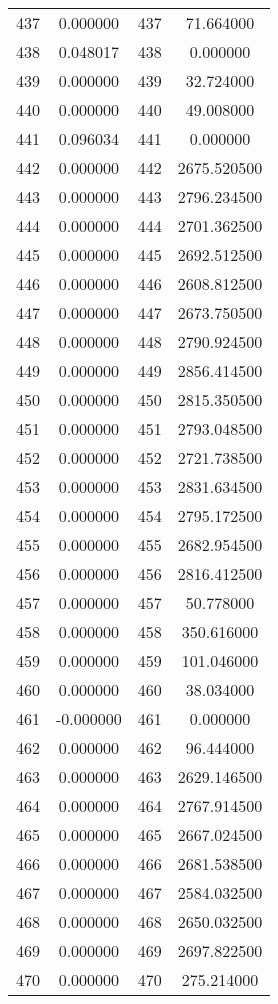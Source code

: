 \documentclass[12pt]{article}
\begin{document}
\begin{longtable}{@{}cccc@{}}
437 & 0.000000 & 437 & 71.664000 \\
438 & 0.048017 & 438 & 0.000000 \\
439 & 0.000000 & 439 & 32.724000 \\
440 & 0.000000 & 440 & 49.008000 \\
441 & 0.096034 & 441 & 0.000000 \\
442 & 0.000000 & 442 & 2675.520500 \\
443 & 0.000000 & 443 & 2796.234500 \\
444 & 0.000000 & 444 & 2701.362500 \\
445 & 0.000000 & 445 & 2692.512500 \\
446 & 0.000000 & 446 & 2608.812500 \\
447 & 0.000000 & 447 & 2673.750500 \\
448 & 0.000000 & 448 & 2790.924500 \\
449 & 0.000000 & 449 & 2856.414500 \\
450 & 0.000000 & 450 & 2815.350500 \\
451 & 0.000000 & 451 & 2793.048500 \\
452 & 0.000000 & 452 & 2721.738500 \\
453 & 0.000000 & 453 & 2831.634500 \\
454 & 0.000000 & 454 & 2795.172500 \\
455 & 0.000000 & 455 & 2682.954500 \\
456 & 0.000000 & 456 & 2816.412500 \\
457 & 0.000000 & 457 & 50.778000 \\
458 & 0.000000 & 458 & 350.616000 \\
459 & 0.000000 & 459 & 101.046000 \\
460 & 0.000000 & 460 & 38.034000 \\
461 & -0.000000 & 461 & 0.000000 \\
462 & 0.000000 & 462 & 96.444000 \\
463 & 0.000000 & 463 & 2629.146500 \\
464 & 0.000000 & 464 & 2767.914500 \\
465 & 0.000000 & 465 & 2667.024500 \\
466 & 0.000000 & 466 & 2681.538500 \\
467 & 0.000000 & 467 & 2584.032500 \\
468 & 0.000000 & 468 & 2650.032500 \\
469 & 0.000000 & 469 & 2697.822500 \\
470 & 0.000000 & 470 & 275.214000 \\

\end{longtable}
\end{document}
